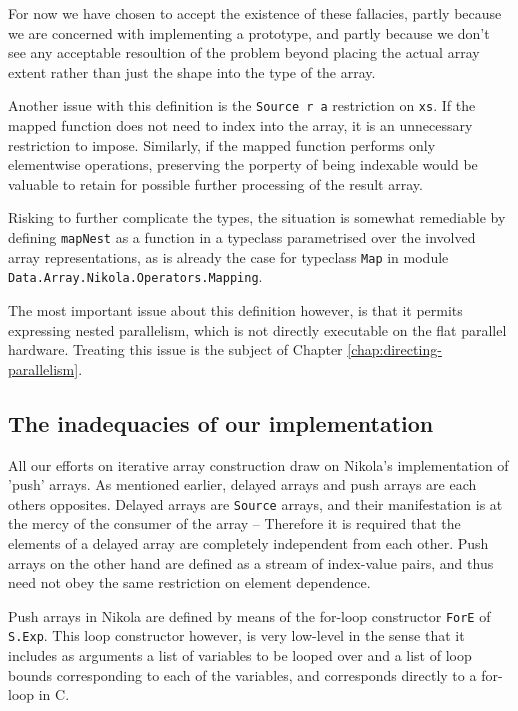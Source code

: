 For now we have chosen to accept the existence of these fallacies,
partly because we are concerned with implementing a prototype, and
partly because we don't see any acceptable resoultion of the problem
beyond placing the actual array extent rather than just the shape into
the type of the array. 

Another issue with this definition is the \texttt{Source r a} restriction on
\texttt{xs}. If the mapped function does not need to index into the array, it
is an unnecessary restriction to impose.  Similarly, if the mapped function
performs only elementwise operations, preserving the porperty of being
indexable would be valuable to retain for possible further processing of the
result array.

Risking to further complicate the types, the situation is somewhat remediable
by defining \texttt{mapNest} as a function in a typeclass parametrised over the
involved array representations, as is already the case for typeclass
\texttt{Map} in module \texttt{Data.Array.Nikola.Operators.Mapping}.

The most important issue about this definition however, is that it permits
expressing nested parallelism, which is not directly executable on the flat
parallel hardware. Treating this issue is the subject of Chapter
\ref{chap:directing-parallelism}.

\subsection{The inadequacies of our implementation}

All our efforts on iterative array construction draw on Nikola's implementation
of 'push' arrays. As mentioned earlier, delayed arrays and push arrays are each
others opposites. Delayed arrays are \texttt{Source} arrays, and their
manifestation is at the mercy of the consumer of the array -- Therefore it is
required that the elements of a delayed array are completely independent from
each other.  Push arrays on the other hand are defined as a stream of
index-value pairs, and thus need not obey the same restriction on element
dependence.

Push arrays in Nikola are defined by means of the for-loop constructor
\texttt{ForE} of \texttt{S.Exp}. This loop constructor however, is very
low-level in the sense that it includes as arguments a list of variables to be
looped over and a list of loop bounds corresponding to each of the variables,
and corresponds directly to a for-loop in C.

